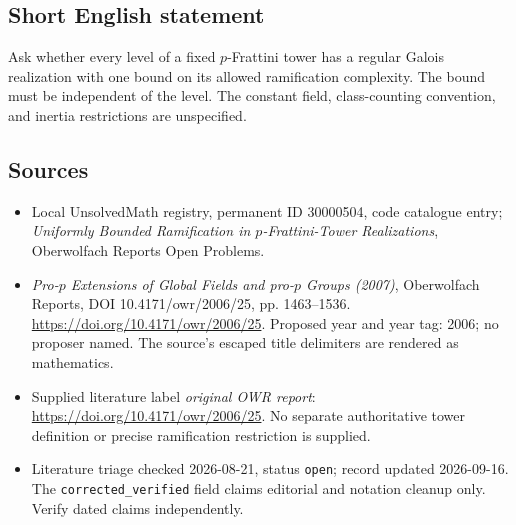 \documentclass[11pt]{article}
\begin{document}
\subsection{Short English statement}
Ask whether every level of a fixed \(p\)-Frattini tower has a regular Galois realization with one bound on its allowed ramification complexity. The bound must be independent of the level. The constant field, class-counting convention, and inertia restrictions are unspecified.
\subsection{Sources}
\begin{itemize}\item Local UnsolvedMath registry, permanent ID 30000504, code catalogue entry; \emph{Uniformly Bounded Ramification in \(p\)-Frattini-Tower Realizations}, Oberwolfach Reports Open Problems.\item \emph{Pro-\(p\) Extensions of Global Fields and pro-\(p\) Groups (2007)}, Oberwolfach Reports, DOI 10.4171/owr/2006/25, pp. 1463--1536. \url{https://doi.org/10.4171/owr/2006/25}. Proposed year and year tag: 2006; no proposer named. The source's escaped title delimiters are rendered as mathematics.\item Supplied literature label \emph{original OWR report}: \url{https://doi.org/10.4171/owr/2006/25}. No separate authoritative tower definition or precise ramification restriction is supplied.\item Literature triage checked 2026-08-21, status \texttt{open}; record updated 2026-09-16. The \texttt{corrected\_verified} field claims editorial and notation cleanup only. Verify dated claims independently.\end{itemize}
\end{document}
